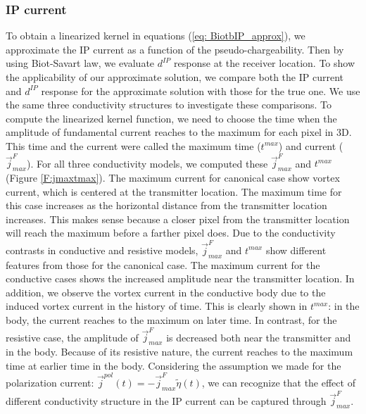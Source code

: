 \documentclass[a4paper, 11pt]{article}
\renewcommand {\j}  { {\vec j} }
\newcommand{\peta}{\tilde{\eta}}
\newcommand{\dip}{d^{IP}}
\begin{document}
\subsubsection{IP current}
To obtain a linearized kernel in equations (\ref{eq: BiotbIP_approx}), we approximate the IP current as a function of the pseudo-chargeability. Then by using Biot-Savart law, we evaluate $\dip$ response at the receiver location. To show the applicability of our approximate solution, we compare both the IP current and $\dip$ response for the approximate solution with those for the true one. We use the same three conductivity structures to investigate these comparisons. To compute the linearized kernel function, we need to choose the time when the amplitude of fundamental current reaches to the maximum for each pixel in 3D. This time and the current were called the maximum time ($t^{max}$) and current ($\j^{F}_{max}$). For all three conductivity models, we computed these $\j^{F}_{max}$ and $t^{max}$ (Figure \ref{F:jmaxtmax}). The maximum current for canonical case show vortex current, which is centered at the transmitter location. The maximum time for this case increases as the horizontal distance from the transmitter location increases. This makes sense because a closer pixel from the transmitter location will reach the maximum before a farther pixel does. Due to the conductivity contrasts in conductive and resistive models, $\j^{F}_{max}$ and $t^{max}$ show different features from those for the canonical case. The maximum current for the conductive cases shows the increased amplitude near the transmitter location. In addition, we observe the vortex current in the conductive body due to the induced vortex current in the history of time. This is clearly shown in $t^{max}$: in the body, the current reaches to the maximum on later time. In contrast, for the resistive case, the amplitude of $\j^{F}_{max}$ is decreased both near the transmitter and in the body. Because of its resistive nature, the current reaches to the maximum time at earlier time in the body. Considering the assumption we made for the polarization current: $\j^{pol}(t) = -\j^F_{max}\peta(t)$, we can recognize that the effect of different conductivity structure in the IP current can be captured through $\j^{F}_{max}$. 
\end{document}
